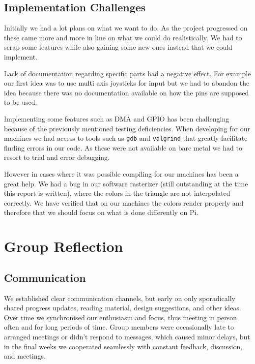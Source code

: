 \documentclass[11pt]{article}
\begin{document}
\subsection{Implementation Challenges}

Initially we had a lot plans on what we want to do. As the project progressed on
these came more and more in line on what we could do realistically. We had to
scrap some features while also gaining some new ones instead that we could
implement.

Lack of documentation regarding specific parts had a negative effect.  For
example our first idea was to use multi axis joysticks for input but we had to
abandon the idea because there was no documentation available on how the pins
are supposed to be used.

Implementing some features such as DMA and GPIO has been challenging because of
the previously mentioned testing deficiencies. When developing for our machines
we had access to tools such as \texttt{gdb} and \texttt{valgrind} that greatly
facilitate finding errors in our code. As these were not available on bare metal
we had to resort to trial and error debugging.

However in cases where it was possible compiling for our machines has been
a great help. We had a bug in our software rasterizer (still outstanding at the
time this report is written), where the colors in the triangle are not
interpolated correctly. We have verified that on our machines the colors render
properly and therefore that we should focus on what is done differently on Pi.

\section{Group Reflection}

\subsection{Communication}

We established clear communication channels, but early on only sporadically
shared progress updates, reading material, design suggestions, and other ideas.
Over time we synchronised our enthusiasm and focus, thus meeting in person
often and for long periods of time. Group members were occasionally late to
arranged meetings or didn't respond to messages, which caused minor delays, but
in the final weeks we cooperated seamlessly with constant feedback, discussion,
and meetings.
\end{document}
